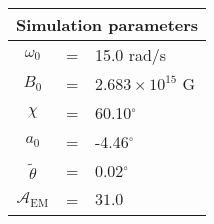 \begin{tabular}{ccl}
\multicolumn{3}{c}{Simulation parameters} \\
\hline
$\omega_0$  &=& 15.0 rad/s\\
$B_0$  &=& ${2.683}\times 10^{15}$ G \\
$\chi$  &=& 60.10$^{\circ}$ \\
$a_0$ &=& -4.46$^{\circ}$ \\
$\tilde{\theta}$ &= & 0.02$^{\circ}$ \\
$\mathcal{A}_{\mathrm{EM}}$ &= & $31.0$
\end{tabular}